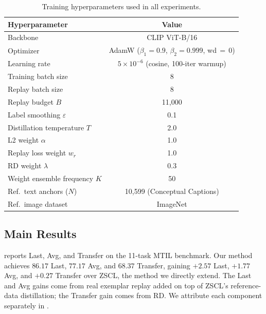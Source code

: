 \documentclass{article}
\begin{document}
  \begin{table}[h]
  \centering
  \caption{Training hyperparameters used in all experiments.}
  \label{tab:hyperparams}
  \begin{tabular}{lc}
  \toprule
  \textbf{Hyperparameter} & \textbf{Value} \\
  \midrule
  Backbone                        & CLIP ViT-B/16 \\
  Optimizer                       & AdamW ($\beta_1{=}0.9$, $\beta_2{=}0.999$, wd$\,{=}\,0$) \\
  Learning rate                   & $5 \times 10^{-6}$ (cosine, 100-iter warmup) \\
  Training batch size             & 8 \\
  Replay batch size               & 8 \\
  Replay budget $B$               & 11{,}000 \\
  Label smoothing $\varepsilon$   & 0.1 \\
  Distillation temperature $T$    & 2.0 \\
  L2 weight $\alpha$              & 1.0 \\
  Replay loss weight $w_r$        & 1.0 \\
  RD weight $\lambda$             & 0.3 \\
  Weight ensemble frequency $K$   & 50 \\
  Ref.\ text anchors ($N$)        & 10{,}599 (Conceptual Captions) \\
  Ref.\ image dataset             & ImageNet \\
  \bottomrule
  \end{tabular}
  \end{table}

  \subsection{Main Results}
  \label{sec:main-results}

   reports Last, Avg, and Transfer on the 11-task MTIL
  benchmark. Our method achieves $86.17$ Last, $77.17$ Avg, and $68.37$ Transfer,
  gaining $+2.57$ Last, $+1.77$ Avg, and $+0.27$ Transfer over ZSCL, the method
  we directly extend. The Last and Avg gains come from real exemplar replay added
  on top of ZSCL's reference-data distillation; the Transfer gain comes from RD.
  We attribute each component separately in .
\end{document}
